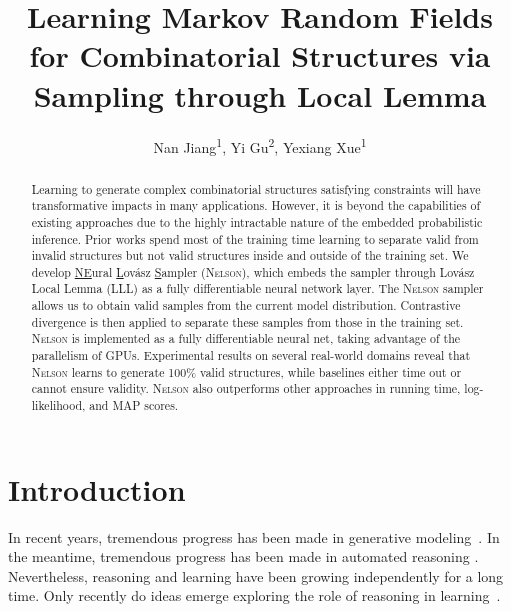 \documentclass[letterpaper]{article} %
\title{Learning Markov Random Fields for Combinatorial Structures via\\
Sampling through \lovasz Local Lemma}
\author{
    Nan Jiang\equalcontrib\textsuperscript{\rm 1},
    Yi Gu\equalcontrib\textsuperscript{\rm 2},
    Yexiang Xue\textsuperscript{\rm 1}
}
\newcommand{\lovasz}{{Lov\'asz}\xspace}
\newcommand{\nls}{\textsc{Nelson}\xspace}
\begin{document}
\maketitle

\begin{abstract}

Learning to generate complex combinatorial structures satisfying constraints will have transformative impacts in many applications.
%
However, it is beyond the capabilities of existing approaches due to the highly intractable nature of the embedded probabilistic inference.
Prior works spend most of the training time learning to separate valid from invalid structures but not valid structures inside and outside of the training set.
%
We develop   \underline{NE}ural \underline{L}ov\'asz \underline{S}ampler (\nls), which embeds the sampler through \lovasz Local Lemma (LLL) as a fully differentiable neural network layer.
%
%
The \nls sampler allows us to obtain valid samples from the current model distribution. 
%
Contrastive divergence is then applied to separate these samples from those in the training set. 
%
\nls is implemented as a fully differentiable neural net, taking advantage of the parallelism of GPUs.
%
Experimental results on several real-world domains reveal that \nls learns to generate 100\% valid structures, while baselines either time out or cannot ensure validity. 
%
\nls also outperforms other approaches in running time, log-likelihood, and MAP scores.

\end{abstract}
\section{Introduction}
In recent years, tremendous progress has been made in generative modeling~\cite{DBLP:journals/neco/Hinton02,Tsochantaridis2005StructualSVM,goodfellow2014generative,kingma2013auto,Germain2015MADEMA,Larochelle2011Autoregressive,Oord2016PixelRN,arjovsky17WGAN,song2019generative,song21scoredifussion,murphy1999loopy,yedidia2001generalized,wainwright2006relaxation}.  In the meantime, tremendous progress has been made in automated reasoning \cite{Braunstein2005SurveyPA,AnHaHoTi2007,chavira2006compiling,VanHentenryck1989,GOGATE2012AndOr,Sang2005}. %
%
Nevertheless, reasoning and learning have been growing independently for a long time. Only recently do ideas emerge exploring the role of reasoning in learning~\cite{kusner17GrammarVAE,Jin2018JunctionTV,Dai2018SyntaxDirectedVA,Hu17ControlledTextGen,lowd2008learning,DBLP:conf/icml/DingMXX21}.
\end{document}
